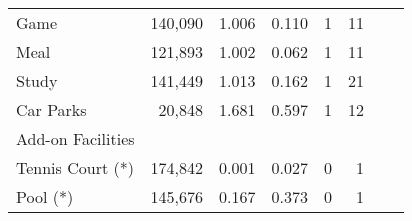 \begin{table}[ht]
{\begin{threeparttable}
\begin{tabular}{lrrrrrrr}
Game                &140,090         &1.006  &0.110   &1    &11\\
Meal                &121,893         &1.002  &0.062   &1    &11\\
Study               &141,449         &1.013  &0.162   &1    &21\\
Car Parks           &20,848          &1.681  &0.597   &1    &12\\
\midrule
Add-on Facilities\\
\midrule
Tennis Court (*)    &174,842         &0.001  &0.027   &0    &1\\
Pool (*)            &145,676         &0.167  &0.373   &0    &1\\
\bottomrule\bottomrule
\end{tabular}
\end{threeparttable}}
\end{table}